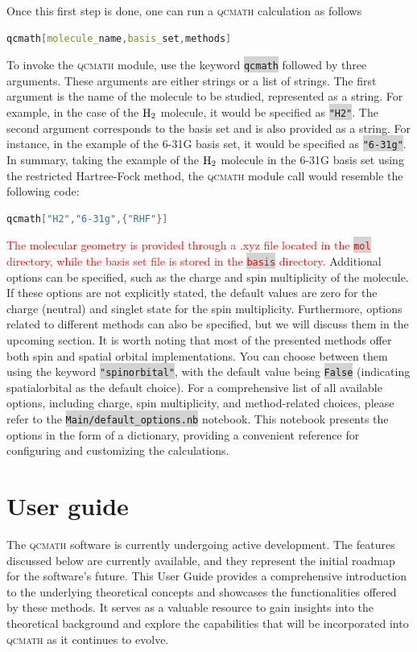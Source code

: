 \documentclass[aip,jcp,reprint,noshowkeys,superscriptaddress]{revtex4-1}
\newcommand{\titou}[1]{\textcolor{red}{#1}}
\newcommand{\qcmath}{\textsc{qcmath}\xspace}
\newcommand{\keyword}[1]{{\colorbox{lightgray}{\texttt{#1}}}}
\begin{document}
Once this first step is done, one can run a \qcmath calculation as follows
\begin{lstlisting}[extendedchars=true,language=Mathematica]
	qcmath[molecule_name,basis_set,methods]
\end{lstlisting}
To invoke the \qcmath module, use the keyword \keyword{qcmath} followed by three arguments. These arguments are either strings or a list of strings. The first argument is the name of the molecule to be studied, represented as a string. For example, in the case of the $\ce{H2}$ molecule, it would be specified as \keyword{"H2"}. The second argument corresponds to the basis set and is also provided as a string. For instance, in the example of the 6-31G basis set, it would be specified as \keyword{"6-31g"}. In summary, taking the example of the $\ce{H2}$ molecule in the 6-31G basis set using the restricted Hartree-Fock method, the \qcmath module call would resemble the following code:
\begin{lstlisting}[extendedchars=true,language=Mathematica]
	qcmath["H2","6-31g",{"RHF"}]
\end{lstlisting}
\titou{The molecular geometry is provided through a .xyz file located in the \keyword{mol} directory, while the basis set file is stored in the \keyword{basis} directory.} Additional options can be specified, such as the charge and spin multiplicity of the molecule. If these options are not explicitly stated, the default values are zero for the charge (neutral) and singlet state for the spin multiplicity.
Furthermore, options related to different methods can also be specified, but we will discuss them in the upcoming section. It is worth noting that most of the presented methods offer both spin and spatial orbital implementations. You can choose between them using the keyword \keyword{"spinorbital"}, with the default value being \keyword{False} (indicating spatialorbital as the default choice).
For a comprehensive list of all available options, including charge, spin multiplicity, and method-related choices, please refer to the \keyword{Main/default\_options.nb} notebook. This notebook presents the options in the form of a dictionary, providing a convenient reference for configuring and customizing the calculations.

\section{User guide}
The \qcmath software is currently undergoing active development. The features discussed below are currently available, and they represent the initial roadmap for the software's future. This User Guide provides a comprehensive introduction to the underlying theoretical concepts and showcases the functionalities offered by these methods. \cite{SzaboBook,JensenBook,Helgakerbook,MartinBook,FetterBook} It serves as a valuable resource to gain insights into the theoretical background and explore the capabilities that will be incorporated into \qcmath as it continues to evolve.
\end{document}
